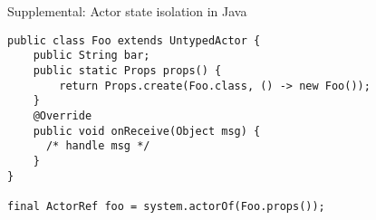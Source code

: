 \documentclass{beamer}
\begin{document}

\begin{frame}[fragile]{Supplemental: Actor state isolation in Java}

\begin{verbatim}
public class Foo extends UntypedActor {
    public String bar;
    public static Props props() {
        return Props.create(Foo.class, () -> new Foo());
    }
    @Override
    public void onReceive(Object msg) { 
      /* handle msg */ 
    }
}

final ActorRef foo = system.actorOf(Foo.props());
\end{verbatim}

\end{frame}

\end{document}
